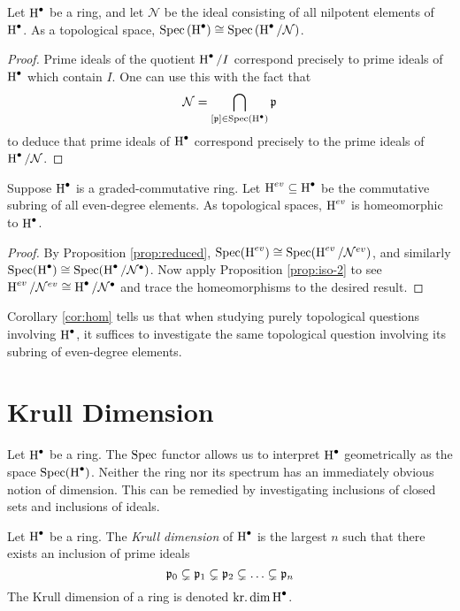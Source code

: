 \begin{proposition} \label{prop:reduced}
  Let $\operatorname{H}^\bullet$ be a ring, and let $\mathcal{N}$ be the ideal consisting of all nilpotent elements of $\operatorname{H}^\bullet$. As a topological space, $\operatorname{Spec} \left(\operatorname{H}^\bullet\right) \cong \operatorname{Spec} \left( \operatorname{H}^\bullet / \mathcal{N} \right)$.
\end{proposition}
\begin{proof}
  Prime ideals of the quotient $\operatorname{H}^\bullet / I$ correspond precisely to prime ideals of $\operatorname{H}^\bullet$ which contain $I$. One can use this with the fact that \[\mathcal{N} = \bigcap_{[\mathfrak{p}] \in \operatorname{Spec}(\operatorname{H}^\bullet)} \mathfrak{p}\] to deduce that prime ideals of $\operatorname{H}^\bullet$ correspond precisely to the prime ideals of $\operatorname{H}^\bullet / \mathcal{N}$.
  
\end{proof}
\begin{corollary} \label{cor:hom}
  Suppose $\operatorname{H}^\bullet$ is a graded-commutative ring. Let $\operatorname{H}^{ev} \subseteq \operatorname{H}^\bullet$ be the commutative subring of all even-degree elements. As topological spaces, $\operatorname{H}^{ev}$ is homeomorphic to $\operatorname{H}^\bullet$.
\end{corollary}
\begin{proof}
  By Proposition \ref{prop:reduced}, $\operatorname{Spec}(\operatorname{H}^{ev}) \cong \operatorname{Spec}(\operatorname{H}^{ev}/\mathcal{N}^{ev})$, and similarly $\operatorname{Spec}(\operatorname{H}^\bullet) \cong \operatorname{Spec}(\operatorname{H}^\bullet/\mathcal{N}^\bullet)$. Now apply Proposition \ref{prop:iso-2} to see $\operatorname{H}^{ev} / \mathcal{N}^{ev} \cong \operatorname{H}^\bullet / \mathcal{N}^\bullet$ and trace the homeomorphisms to the desired result.
\end{proof}

Corollary \ref{cor:hom} tells us that when studying purely topological questions involving $\operatorname{H}^\bullet$, it suffices to investigate the same topological question involving its subring of even-degree elements.
\section{Krull Dimension}
\label{sec:krull}

Let $\operatorname{H}^\bullet$ be a ring. The $\operatorname{Spec}$ functor allows us to interpret $\operatorname{H}^\bullet$ geometrically as the space $\operatorname{Spec}(\operatorname{H}^\bullet)$. Neither the ring nor its spectrum has an immediately obvious notion of dimension. This can be remedied by investigating inclusions of closed sets and inclusions of ideals.

\begin{definition} Let $\operatorname{H}^\bullet$ be a ring. The \emph{Krull dimension} of $\operatorname{H}^\bullet$ is the largest $n$ such that there exists an inclusion of prime ideals
    \begin{equation}
      \label{eq:krull-ideals}
      \mathfrak{p}_0 \subsetneq \mathfrak{p}_1 \subsetneq \mathfrak{p}_2 \subsetneq \ldots \subsetneq \mathfrak{p}_n
    \end{equation}
    The Krull dimension of a ring is denoted $\operatorname{kr.dim} \operatorname{H}^\bullet$.
\end{definition}

